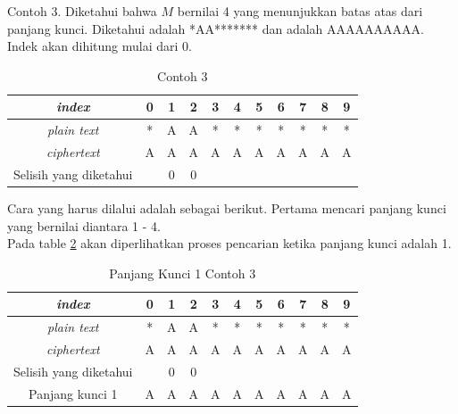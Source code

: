 		
	Contoh 3. Diketahui bahwa $M$ bernilai 4 yang menunjukkan batas atas dari panjang kunci. Diketahui \plaintext adalah *AA******* dan \ciphertext adalah AAAAAAAAAA. Indek akan dihitung mulai dari 0. 
	 \begin{table}[H]
	 	\centering
	 	\begin{tabular}{|c|c|c|c|c|c|c|c|c|c|c|}\hline
	 	\textit{index}&0&1&2&3&4&5&6&7&8&9\\ \hline
	 	\textit{plain text}&*&A&A&*&*&*&*&*&*&*\\ \hline
	 	\textit{ciphertext}&A&A&A&A&A&A&A&A&A&A\\ \hline
		Selisih yang diketahui & &0&0& & & & & & & \\ \hline	 	
	 	\end{tabular}
	 	\caption{ Contoh 3}
	 	\label{tab:contoh3}
	\end{table}
	
	Cara yang harus dilalui adalah sebagai berikut. Pertama mencari panjang kunci yang bernilai diantara 1 - 4. \\
	Pada table \ref{tab:k1contoh3} akan diperlihatkan proses pencarian ketika panjang kunci adalah 1.
	\begin{table}[H]
	 	\centering
	 	\setlength{\arrayrulewidth}{.08em}
	 	\begin{tabular}{|c|c|c|c|c|c|c|c|c|c|c|}\hline
	 	\textit{index}&0&1&2&3&4&5&6&7&8&9\\ \hline
	 	\textit{plain text}&\cellcolor{blue!15}*&\cellcolor{yellow!25}A&\cellcolor{green!15}A&\cellcolor{lime!25}*&\cellcolor{pink!30}*&\cellcolor{red!15}*&\cellcolor{violet!30}*&\cellcolor{magenta!15}*&\cellcolor{purple!25}*&\cellcolor{teal!35}*\\ \hline
	 	\textit{ciphertext}&\cellcolor{blue!15}A&\cellcolor{yellow!25}A&\cellcolor{green!15}A&\cellcolor{lime!25}A&\cellcolor{pink!30}A&\cellcolor{red!15}A&\cellcolor{violet!30}A&\cellcolor{magenta!15}A&\cellcolor{purple!25}A&\cellcolor{teal!35}A\\ \hline
		Selisih yang diketahui & &0&0& & & & & & & \\ \hline	
		Panjang kunci 1 &A&A&A&A&A&A&A&A&A&A\\ \hline 	
	 	\end{tabular}
	 	\caption{Panjang Kunci 1 Contoh 3}
	 	\label{tab:k1contoh3}
	\end{table}
	
